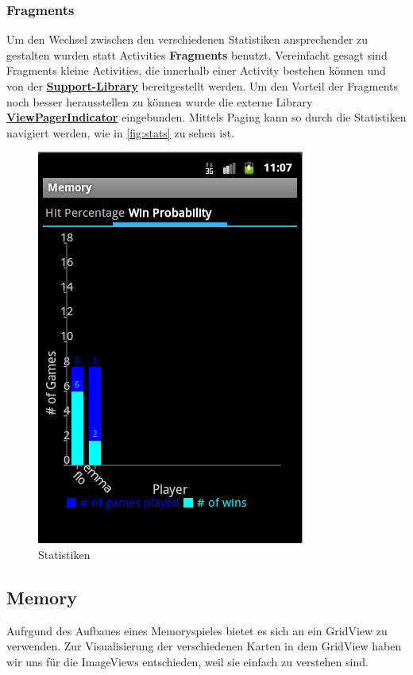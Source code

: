 \documentclass[11pt,a4paper]{article}
\begin{document}
\subsubsection{Fragments}
Um den Wechsel zwischen den verschiedenen Statistiken ansprechender zu gestalten wurden statt Activities \textbf{Fragments} benutzt. Vereinfacht gesagt sind Fragments kleine Activities, die innerhalb einer Activity bestehen können und von der \textbf{\href{http://developer.android.com/tools/extras/support-library.html}{Support-Library}} bereitgestellt werden.
Um den Vorteil der Fragments noch besser herausstellen zu können wurde die externe Library \textbf{\href{http://viewpagerindicator.com/}{ViewPagerIndicator}} eingebunden. Mittels Paging  kann so durch die Statistiken navigiert werden, wie in \autoref{fig:stats} zu sehen ist.
\begin{figure}[!h]
\centering
\includegraphics[scale=0.7]{pics/stats.png}
\caption{Statistiken}
\label{fig:stats}
\end{figure}
\subsection{Memory}
Aufrgund des Aufbaues eines Memoryspieles bietet es sich an ein GridView zu verwenden. Zur Visualisierung der verschiedenen Karten in dem GridView haben wir uns für die ImageViews entschieden, weil sie einfach zu verstehen sind. \\
\end{document}
